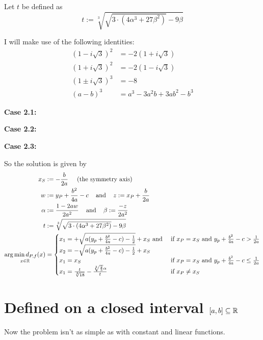 Let $t$ be defined as
\[t := \sqrt[3]{\sqrt{3 \cdot (4 \alpha^3 + 27 \beta^2)} -9\beta}\]

I will make use of the following identities:
\begin{align*}
    (1-i \sqrt{3})^2     &= -2 (1+i \sqrt{3})\\
    (1+i \sqrt{3})^2     &= -2 (1-i \sqrt{3})\\
    (1 \pm i \sqrt{3})^3 &= -8\\
    (a-b)^3              &= a^3-3 a^2 b+3 a b^2-b^3
\end{align*}

\textbf{Case 2.1:} 

\goodbreak
\textbf{Case 2.2:}


\textbf{Case 2.3:}


\goodbreak
So the solution is given by
\begin{align*}
x_S &:= - \frac{b}{2a} \;\;\;\;\; \text{(the symmetry axis)}\\
w &:= y_P+\frac{b^2}{4a}-c \;\;\; \text{ and } \;\;\; z := x_P+\frac{b}{2a}\\
\alpha &:= \frac{1- 2 aw}{2 a^2} \;\;\;\text{ and }\;\;\; \beta := \frac{-z}{2 a^2}\\
t &:= \sqrt[3]{\sqrt{3 \cdot (4 \alpha^3 + 27 \beta^2)} -9\beta}\\
\underset{x\in\mathbb{R}}{\arg \min d_{P,f}(x)} &= \begin{cases}
     x_1 = +\sqrt{a (y_p + \frac{b^2}{4a} - c) - \frac{1}{2}} + x_S \text{ and }   &\text{if } x_P = x_S \text{ and } y_p + \frac{b^2}{4a} - c >  \frac{1}{2a} \\
     x_2 = -\sqrt{a (y_p + \frac{b^2}{4a} - c) - \frac{1}{2}} + x_S\\
     x_1 = x_S   &\text{if } x_P = x_S \text{ and } y_p + \frac{b^2}{4a} - c \leq  \frac{1}{2a} \\
     x_1 = \frac{t}{\sqrt[3]{18}} - \frac{\sqrt[3]{\frac{2}{3}} \alpha }{t}   &\text{if } x_P \neq x_S
    \end{cases}
\end{align*}
\clearpage

\section{Defined on a closed interval $[a,b] \subseteq \mathbb{R}$}
Now the problem isn't as simple as with constant and linear
functions.


